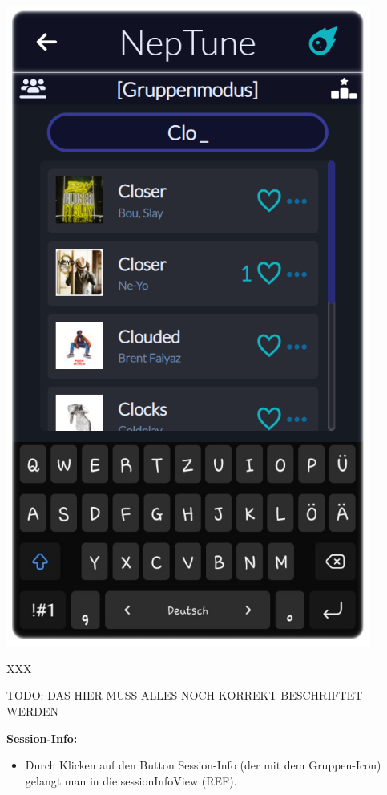 \documentclass[oneside, ngerman]{sdqtechreport}
\begin{document}
\begin{minipage}{0.5\textwidth}
    \hypertarget{hostSearchView}{}
    \includegraphics[width=0.9\textwidth]{LATEX/Pflichtenheft/GraphicDesigns/hostSearchPage.png}
\end{minipage} 
\hfill
\begin{minipage}{0.5\textwidth}
    XXX
\end{minipage}

TODO: DAS HIER MUSS ALLES NOCH KORREKT BESCHRIFTET WERDEN

\textbf{Session-Info:}
\begin{itemize}
    \item Durch Klicken auf den Button Session-Info (der mit dem Gruppen-Icon) gelangt man in die sessionInfoView (REF).
\end{itemize}
\end{document}
